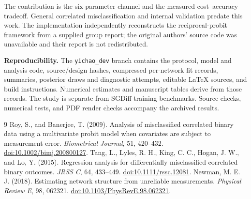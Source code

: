 \documentclass[10pt]{article}
\begin{document}
The contribution is the six-parameter channel and the measured cost--accuracy tradeoff. General correlated misclassification and internal validation predate this work. The implementation independently reconstructs the reciprocal-probit framework from a supplied group report; the original authors' source code was unavailable and their report is not redistributed.

\textbf{Reproducibility.} The \texttt{yichao\_dev} branch contains the protocol, model and analysis code, source/design hashes, compressed per-network fit records, summaries, posterior draws and diagnostic attempts, editable \LaTeX{} sources, and build instructions. Numerical estimates and manuscript tables derive from those records. The study is separate from SGDiff training benchmarks. Source checks, numerical tests, and PDF render checks accompany the archived results.

\begin{thebibliography}{9}\small\setlength{\itemsep}{1pt}\setlength{\parskip}{0pt}
 Roy, S., and Banerjee, T. (2009). Analysis of misclassified correlated binary data using a multivariate probit model when covariates are subject to measurement error. \emph{Biometrical Journal}, 51, 420--432. \href{https://doi.org/10.1002/bimj.200800127}{doi:10.1002/bimj.200800127}.
 Tang, L., Lyles, R. H., King, C. C., Hogan, J. W., and Lo, Y. (2015). Regression analysis for differentially misclassified correlated binary outcomes. \emph{JRSS C}, 64, 433--449. \href{https://doi.org/10.1111/rssc.12081}{doi:10.1111/rssc.12081}.
 Newman, M. E. J. (2018). Estimating network structure from unreliable measurements. \emph{Physical Review E}, 98, 062321. \href{https://doi.org/10.1103/PhysRevE.98.062321}{doi:10.1103/PhysRevE.98.062321}.
\end{thebibliography}
\end{document}
